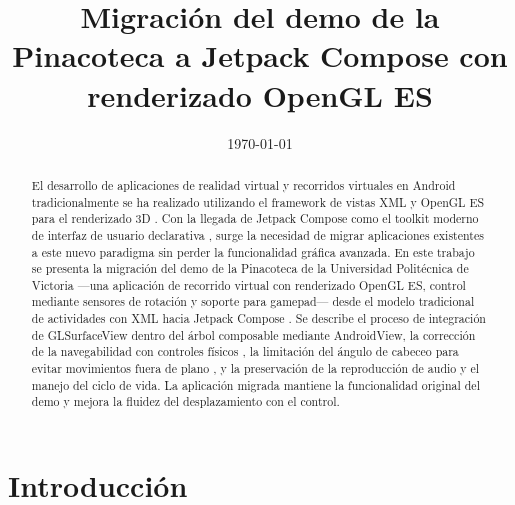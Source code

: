 \documentclass[conference]{IEEEtran}
\date{\specialdate\today}
\begin{document}
\newcommand{\breite}{1.0}

\title{Migración del demo de la Pinacoteca a Jetpack Compose con renderizado OpenGL ES}

\author{
}

\maketitle

\begin{abstract}
El desarrollo de aplicaciones de realidad virtual y recorridos virtuales en Android tradicionalmente se ha realizado utilizando el framework de vistas XML y OpenGL ES para el renderizado 3D \cite{wright2010}. Con la llegada de Jetpack Compose como el toolkit moderno de interfaz de usuario declarativa \cite{android_compose}, surge la necesidad de migrar aplicaciones existentes a este nuevo paradigma sin perder la funcionalidad gráfica avanzada. En este trabajo se presenta la migración del demo de la Pinacoteca de la Universidad Politécnica de Victoria ---una aplicación de recorrido virtual con renderizado OpenGL ES, control mediante sensores de rotación y soporte para gamepad--- desde el modelo tradicional de actividades con XML hacia Jetpack Compose \cite{compose_viewinterop}. Se describe el proceso de integración de GLSurfaceView dentro del árbol composable mediante AndroidView, la corrección de la navegabilidad con controles físicos \cite{android_gamepad}, la limitación del ángulo de cabeceo para evitar movimientos fuera de plano \cite{android_sensors}, y la preservación de la reproducción de audio y el manejo del ciclo de vida. La aplicación migrada mantiene la funcionalidad original del demo y mejora la fluidez del desplazamiento con el control.
\end{abstract}

\section{Introducción}
\end{document}
